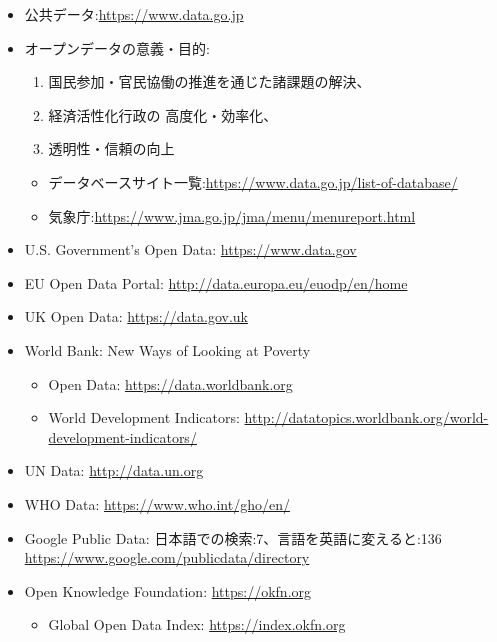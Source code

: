 \documentclass[
]{bxjsbook}
\providecommand{\tightlist}{%
  \setlength{\itemsep}{0pt}\setlength{\parskip}{0pt}}
\theoremstyle{definition}
\theoremstyle{definition}
\theoremstyle{definition}
\theoremstyle{definition}
\theoremstyle{remark}
\begin{document}
\begin{itemize}
\item
  公共データ:\url{https://www.data.go.jp}
\item
  オープンデータの意義・目的:

  \begin{enumerate}
  \def\labelenumi{\arabic{enumi}.}
  \tightlist
  \item
    国民参加・官民協働の推進を通じた諸課題の解決、
  \item
    経済活性化行政の 高度化・効率化、
  \item
    透明性・信頼の向上
  \end{enumerate}

  \begin{itemize}
  \tightlist
  \item
    データベースサイト一覧:\url{https://www.data.go.jp/list-of-database/}\\
  \item
    気象庁:\url{https://www.jma.go.jp/jma/menu/menureport.html}
  \end{itemize}
\item
  U.S. Government's Open Data: \url{https://www.data.gov}
\item
  EU Open Data Portal: \url{http://data.europa.eu/euodp/en/home}
\item
  UK Open Data: \url{https://data.gov.uk}
\item
  World Bank: New Ways of Looking at Poverty

  \begin{itemize}
  \tightlist
  \item
    Open Data: \url{https://data.worldbank.org}
  \item
    World Development Indicators: \url{http://datatopics.worldbank.org/world-development-indicators/}
  \end{itemize}
\item
  UN Data: \url{http://data.un.org}
\item
  WHO Data: \url{https://www.who.int/gho/en/}
\item
  Google Public Data: 日本語での検索:7、言語を英語に変えると:136 \url{https://www.google.com/publicdata/directory}
\item
  Open Knowledge Foundation: \url{https://okfn.org}

  \begin{itemize}
  \tightlist
  \item
    Global Open Data Index: \url{https://index.okfn.org}
  \end{itemize}
\end{itemize}
\end{document}
